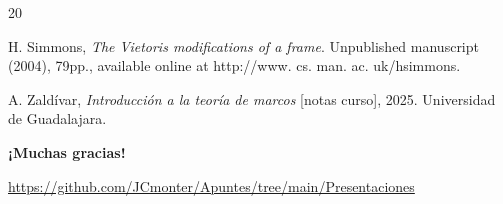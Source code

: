 \documentclass[compress,12pt]{beamer}
\begin{document}
\begin{frame}[allowframebreaks]
\begin{thebibliography}{20}

 H. Simmons, \textit{The Vietoris modifications of a frame}. Unpublished manuscript (2004), 79pp., available online at http://www. cs. man. ac. uk/hsimmons.


 A. Zaldívar, \textit{Introducción a la teoría de marcos} [notas curso], 2025. Universidad de Guadalajara.
\end{thebibliography}
\end{frame}

\begin{frame}
      \centering
      \Huge{\bfseries \smiley ¡Muchas gracias! \smiley}\\[1cm]
      \scalebox{4}{\faGithub} \par\bigskip
      \url{https://github.com/JCmonter/Apuntes/tree/main/Presentaciones} \\
\end{frame}
\end{document}

